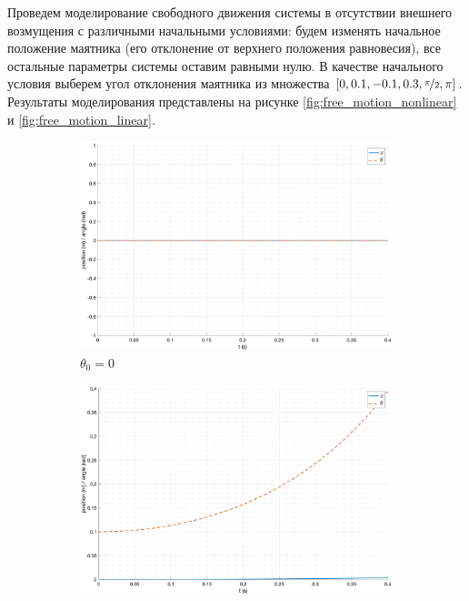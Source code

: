 Проведем моделирование свободного движения системы в отсутствии внешнего 
возмущения с различными начальными условиями: будем изменять 
начальное положение маятника (его отклонение от верхнего положения равновесия), все остальные параметры 
системы оставим равными нулю. В качестве начального условия выберем угол отклонения маятника из множества 
$[0, 0.1, -0.1, 0.3, \nicefrac{\pi}{2}, \pi]$. Результаты моделирования представлены на
рисунке \ref{fig:free_motion_nonlinear} и \ref{fig:free_motion_linear}.
\begin{figure}[ht!]
    \centering
    \begin{subfigure}[b]{0.45\textwidth}
        \includegraphics[width=\textwidth]{media/plots/free_motion/nonlin_1.png}
        \caption{$\theta_0 = 0$}
  \end{subfigure}
    \begin{subfigure}[b]{0.45\textwidth}
        \includegraphics[width=\textwidth]{media/plots/free_motion/nonlin_2.png}

\end{subfigure}
\end{figure}

